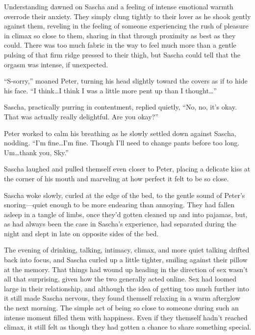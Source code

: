 Understanding dawned on Sascha and a feeling of intense emotional warmth overrode their anxiety. They simply clung tightly to their lover as he shook gently against them, reveling in the feeling of someone experiencing the rush of pleasure in climax so close to them, sharing in that through proximity as best as they could. There was too much fabric in the way to feel much more than a gentle pulsing of that firm ridge pressed to their thigh, but Sascha could tell that the orgasm was intense, if unexpected.

``S-sorry,'' moaned Peter, turning his head slightly toward the covers as if to hide his face. ``I think\ldots{}I think I was a little more pent up than I thought\ldots{}''

Sascha, practically purring in contentment, replied quietly, ``No, no, it's okay. That was actually really delightful. Are you okay?''

Peter worked to calm his breathing as he slowly settled down against Sascha, nodding. ``I'm fine\ldots{}I'm fine. Though I'll need to change pants before too long. Um\ldots{}thank you, Sky.''

Sascha laughed and pulled themself even closer to Peter, placing a delicate kiss at the corner of his mouth and marveling at how perfect it felt to be so close.

\secdiv{}

Sascha woke slowly, curled at the edge of the bed, to the gentle sound of Peter's snoring---quiet enough to be more endearing than annoying. They had fallen asleep in a tangle of limbs, once they'd gotten cleaned up and into pajamas, but, as had always been the case in Sascha's experience, had separated during the night and slept in late on opposite sides of the bed.

The evening of drinking, talking, intimacy, climax, and more quiet talking drifted back into focus, and Sascha curled up a little tighter, smiling against their pillow at the memory. That things had wound up heading in the direction of sex wasn't all that surprising, given how the two generally acted online. Sex had loomed large in their relationship, and although the idea of getting too much further into it still made Sascha nervous, they found themself relaxing in a warm afterglow the next morning. The simple act of being so close to someone during such an intense moment filled them with happiness. Even if they themself hadn't reached climax, it still felt as though they had gotten a chance to share something special.


